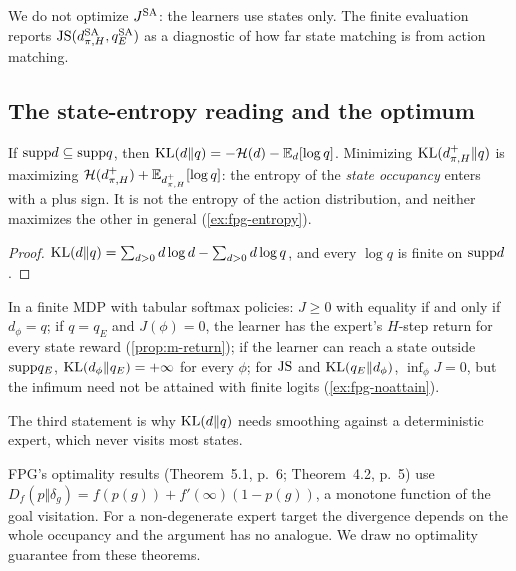 We do not optimize $J^{\mathrm{SA}}$: the learners use states only. The finite evaluation reports $\mathrm{JS}(d^{\mathrm{SA}}_{\pi,H},q^{\mathrm{SA}}_E)$ as a diagnostic of how far state matching is from action matching.

\subsection{The state-entropy reading and the optimum}

\begin{proposition}\label{prop:m-maxent}
If $\mathrm{supp} d\subseteq\mathrm{supp} q$, then $\mathrm{KL}(d\Vert q)=-\mathcal{H}(d)-\mathbb{E}_d[\log q]$. Minimizing $\mathrm{KL}(d^+_{\pi,H}\Vert q)$ is maximizing $\mathcal{H}(d^+_{\pi,H})+\mathbb{E}_{d^+_{\pi,H}}[\log q]$: the entropy of the \emph{state occupancy} enters with a plus sign. It is not the entropy of the action distribution, and neither maximizes the other in general (\cref{ex:fpg-entropy}).
\end{proposition}
\begin{proof}
$\mathrm{KL}(d\Vert q)=\sum_{d>0}d\log d-\sum_{d>0}d\log q$, and every $\log q$ is finite on $\mathrm{supp} d$.
\end{proof}

\begin{proposition}\label{prop:m-fpg-opt}
In a finite MDP with tabular softmax policies: $J\ge0$ with equality if and only if $d_\phi=q$; if $q=q_E$ and $J(\phi)=0$, the learner has the expert's $H$-step return for every state reward (\cref{prop:m-return}); if the learner can reach a state outside $\mathrm{supp} q_E$, $\mathrm{KL}(d_\phi\Vert q_E)=+\infty$ for every $\phi$; for $\mathrm{JS}$ and $\mathrm{KL}(q_E\Vert d_\phi)$, $\inf_\phi J=0$, but the infimum need not be attained with finite logits (\cref{ex:fpg-noattain}).
\end{proposition}

The third statement is why $\mathrm{KL}(d\Vert q)$ needs smoothing against a deterministic expert, which never visits most states.

\begin{remark}\label{rem:m-dirac}
FPG's optimality results (Theorem~5.1, p.~6; Theorem~4.2, p.~5) use $D_f(p\Vert\delta_g)=f(p(g))+f'(\infty)(1-p(g))$, a monotone function of the goal visitation. For a non-degenerate expert target the divergence depends on the whole occupancy and the argument has no analogue. We draw no optimality guarantee from these theorems.
\end{remark}
